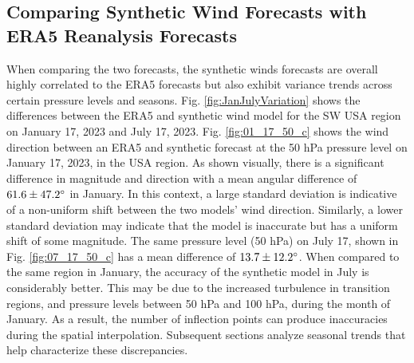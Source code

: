 \subsection{Comparing Synthetic Wind Forecasts with ERA5 Reanalysis Forecasts} \label{SynthForecastModeling_SynthCompareERA5}


When comparing the two forecasts, the synthetic winds forecasts are overall highly correlated to the ERA5 forecasts but also exhibit variance trends across certain pressure levels and seasons. Fig. \ref{fig:JanJulyVariation} shows the differences between the ERA5 and synthetic wind model for the SW USA region on January 17, 2023 and July 17, 2023. Fig. \ref{fig:01_17_50_c} shows the wind direction between an ERA5 and synthetic forecast at the 50 hPa pressure level on January 17, 2023, in the USA region. As shown visually, there is a significant difference in magnitude and direction with a mean angular difference of $61.6 \pm 47.2 \degree$ in January.  In this context, a large standard deviation is indicative of a non-uniform shift between the two models' wind direction. Similarly, a lower standard deviation may indicate that the model is inaccurate but has a uniform shift of some magnitude.
The same pressure level (50 hPa) on July 17, shown in Fig. \ref{fig:07_17_50_c} has a mean difference of $13.7 \pm 12.2 \degree$. When compared to the same region in January, the accuracy of the synthetic model in July is considerably better. 
This may be due to the increased turbulence in transition regions, and pressure levels between 50 hPa and 100 hPa, during the month of January. As a result, the number of inflection points can produce inaccuracies during the spatial interpolation. Subsequent sections analyze seasonal trends that help characterize these discrepancies. 

